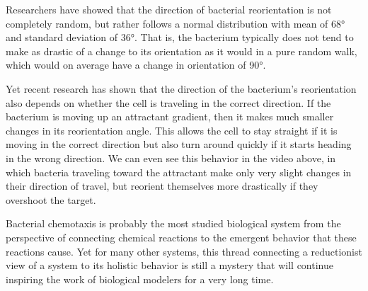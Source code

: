 Researchers have showed that the direction of bacterial reorientation is not completely random, but rather follows a normal distribution with mean of 68° and standard deviation of 36°\citep{Berg_1972}. That is, the bacterium typically does not tend to make as drastic of a change to its orientation as it would in a pure random walk, which would on average have a change in orientation of 90°.

Yet recent research has shown that the direction of the bacterium's reorientation also depends on whether the cell is traveling in the correct direction.\citep{Saragosti_2011} If the bacterium is moving up an attractant gradient, then it makes much smaller changes in its reorientation angle. This allows the cell to stay straight if it is moving in the correct direction but also turn around quickly if it starts heading in the wrong direction. We can even see this behavior in the video above, in which bacteria traveling toward the attractant make only very slight changes in their direction of travel, but reorient themselves more drastically if they overshoot the target.

Bacterial chemotaxis is probably the most studied biological system from the perspective of connecting chemical reactions to the emergent behavior that these reactions cause. Yet for many other systems, this thread connecting a reductionist view of a system to its holistic behavior is still a mystery that will continue inspiring the work of biological modelers for a very long time.
